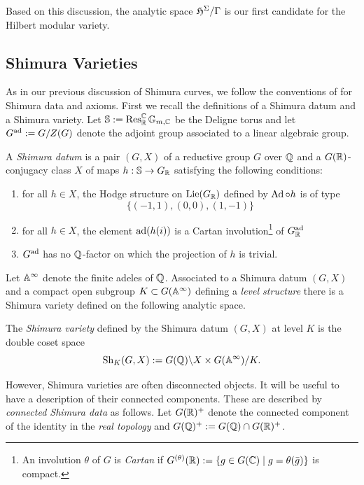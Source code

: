 \documentclass[main.tex]{subfiles}
\begin{document}
Based on this discussion, the analytic space $\mathfrak{H}^{\Sigma} / \Gamma$ is our first candidate for the Hilbert modular variety.

\subsection{Shimura Varieties}

As in our previous discussion of Shimura curves, we follow the conventions of \cite{milne:shimura_varieties} for Shimura data and axioms. First we recall the definitions of a Shimura datum and a Shimura variety. Let $\mathbb{S} := \operatorname{\mathrm{Res}}^{\mathbb{C}}_{\mathbb{R}} \mathbb{G}_{m,\mathbb{C}}$ be the Deligne torus and let $G^{\operatorname{\mathrm{ad}}} := G / Z(G)$ denote the adjoint group associated to a linear algebraic group. 

\begin{defn}
A \textit{Shimura datum} is a pair $(G, X)$ of a reductive group $G$ over $\mathbb{Q}$ and a $G(\mathbb{R})$-conjugacy class $X$ of maps $h : \mathbb{S} \to G_{\mathbb{R}}$ satisfying the following conditions:
\begin{enumerate}
\item[(SV1)] for all $h \in X$, the Hodge structure on $\mathrm{Lie}(G_{\mathbb{R}})$ defined by $\operatorname{\mathrm{Ad}} \circ h$ is of type
\[ \{ (-1,1), (0,0), (1,-1) \} \]
\item[(SV2)] for all $h \in X$, the element $\operatorname{\mathrm{ad}}(h(i))$ is a Cartan involution\footnote{An involution $\theta$ of $G$ is \textit{Cartan} if $G^{(\theta)}(\mathbb{R}) := \{ g \in G(\mathbb{C}) \mid g = \theta(\bar{g}) \}$ is compact.} of $G_{\mathbb{R}}^{\operatorname{\mathrm{ad}}}$ 
\item[(SV3)] $G^{\operatorname{\mathrm{ad}}}$ has no $\mathbb{Q}$-factor on which the projection of $h$ is trivial.
\end{enumerate}
\end{defn}

Let $\mathbb{A}^{\infty}$ denote the finite adeles of $\mathbb{Q}$. Associated to a Shimura datum $(G, X)$ and a compact open subgroup $K \subset G(\mathbb{A}^{\infty})$ defining a \textit{level structure} there is a Shimura variety defined on the following analytic space.

\begin{defn}
The \textit{Shimura variety} defined by the Shimura datum $(G, X)$ at level $K$ is the double coset space
\[ \mathrm{Sh}_K(G, X) := G(\mathbb{Q}) \backslash X \times G(\mathbb{A}^{\infty}) / K. \]
\end{defn}

However, Shimura varieties are often disconnected objects. It will be useful to have a description of their connected components. These are described by \textit{connected Shimura data} as follows. Let $G(\mathbb{R})^+$ denote the connected component of the identity in the \textit{real topology} and $G(\mathbb{Q})^+ := G(\mathbb{Q}) \cap G(\mathbb{R})^+$.
\end{document}

